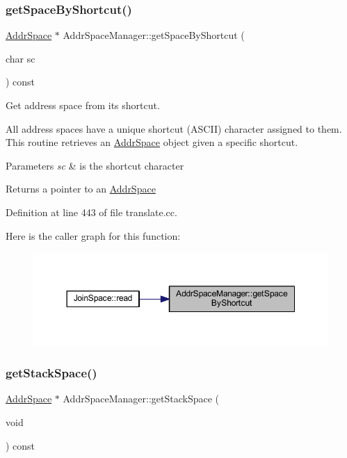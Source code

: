 \subsubsection{\texorpdfstring{getSpaceByShortcut()}{getSpaceByShortcut()}}
{\footnotesize\ttfamily \mbox{\hyperlink{class_addr_space}{Addr\+Space}} $\ast$ Addr\+Space\+Manager\+::get\+Space\+By\+Shortcut (\begin{DoxyParamCaption}\item[{char}]{sc }\end{DoxyParamCaption}) const}



Get address space from its shortcut. 

All address spaces have a unique shortcut (A\+S\+C\+II) character assigned to them. This routine retrieves an \mbox{\hyperlink{class_addr_space}{Addr\+Space}} object given a specific shortcut. 
\begin{DoxyParams}{Parameters}
{\em sc} & is the shortcut character \\
\hline
\end{DoxyParams}
\begin{DoxyReturn}{Returns}
a pointer to an \mbox{\hyperlink{class_addr_space}{Addr\+Space}} 
\end{DoxyReturn}


Definition at line 443 of file translate.\+cc.

Here is the caller graph for this function\+:
\nopagebreak
\begin{figure}[H]
\begin{center}
\leavevmode
\includegraphics[width=350pt]{class_addr_space_manager_aa69937486b7d2b062011ac39d5513ee3_icgraph}
\end{center}
\end{figure}
\mbox{\label{class_addr_space_manager_a00f3afd0adb68f208c31a9716abe5a4f}} 
\subsubsection{\texorpdfstring{getStackSpace()}{getStackSpace()}}
{\footnotesize\ttfamily \mbox{\hyperlink{class_addr_space}{Addr\+Space}} $\ast$ Addr\+Space\+Manager\+::get\+Stack\+Space (\begin{DoxyParamCaption}\item[{void}]{ }\end{DoxyParamCaption}) const\hspace{0.3cm}{\ttfamily [inline]}}



